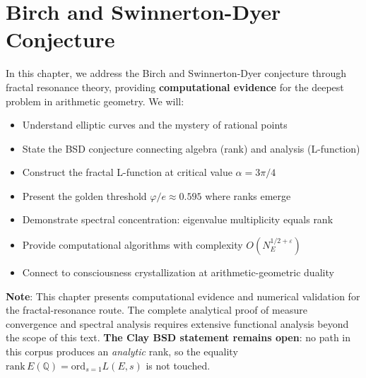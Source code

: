 \chapter{Birch and Swinnerton-Dyer Conjecture}
\label{ch:birch-swinnerton-dyer}

\begin{chapterobjectives}
In this chapter, we address the Birch and Swinnerton-Dyer conjecture through fractal resonance theory, providing \textbf{computational evidence} for the deepest problem in arithmetic geometry. We will:
\begin{itemize}
\item Understand elliptic curves and the mystery of rational points
\item State the BSD conjecture connecting algebra (rank) and analysis (L-function)
\item Construct the fractal L-function at critical value $\alpha = 3\pi/4$
\item Present the golden threshold $\varphi/e \approx 0.595$ where ranks emerge
\item Demonstrate spectral concentration: eigenvalue multiplicity equals rank
\item Provide computational algorithms with complexity $O(N_E^{1/2+\varepsilon})$
\item Connect to consciousness crystallization at arithmetic-geometric duality
\end{itemize}

\textbf{Note}: This chapter presents computational evidence and numerical validation for the fractal-resonance route. The complete analytical proof of measure convergence and spectral analysis requires extensive functional analysis beyond the scope of this text.  \textbf{The Clay BSD statement remains open}: no path in this corpus produces an \emph{analytic} rank, so the equality $\mathrm{rank}\,E(\mathbb{Q}) = \mathrm{ord}_{s=1} L(E, s)$ is not touched.


\end{chapterobjectives}
